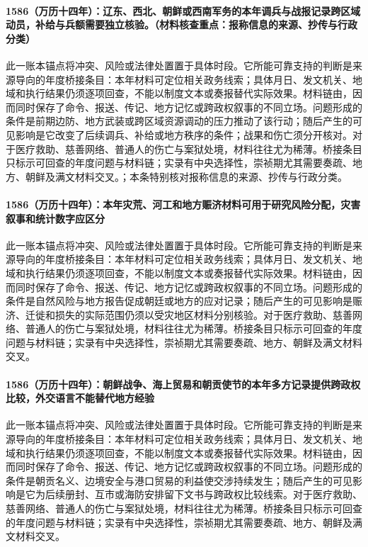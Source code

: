 \paragraph{1586（万历十四年）：辽东、西北、朝鲜或西南军务的本年调兵与战报记录跨区域动员，补给与兵额需要独立核验。（材料核查重点：报称信息的来源、抄传与行政分类）} 此一账本锚点将冲突、风险或法律处置置于具体时段。它所能可靠支持的判断是来源导向的年度桥接条目：本年材料可定位相关政务线索；具体月日、发文机关、地域和执行结果仍须逐项回查，不能以制度文本或奏报替代实际效果。材料链由，因而同时保存了命令、报送、传记、地方记忆或跨政权叙事的不同立场。问题形成的条件是前期边防、地方武装或跨区域资源调动的压力推动了该行动；随后产生的可见影响是它改变了后续调兵、补给或地方秩序的条件；战果和伤亡须分开核对。对于医疗救助、慈善网络、普通人的伤亡与案狱处境，材料往往尤为稀薄。桥接条目只标示可回查的年度问题与材料链；实录有中央选择性，崇祯期尤其需要奏疏、地方、朝鲜及满文材料交叉。；本条特别核对报称信息的来源、抄传与行政分类。

\paragraph{1586（万历十四年）：本年灾荒、河工和地方赈济材料可用于研究风险分配，灾害叙事和统计数字应区分} 此一账本锚点将冲突、风险或法律处置置于具体时段。它所能可靠支持的判断是来源导向的年度桥接条目：本年材料可定位相关政务线索；具体月日、发文机关、地域和执行结果仍须逐项回查，不能以制度文本或奏报替代实际效果。材料链由，因而同时保存了命令、报送、传记、地方记忆或跨政权叙事的不同立场。问题形成的条件是自然风险与地方报告促成朝廷或地方的应对记录；随后产生的可见影响是赈济、迁徙和损失的实际范围仍须以受灾地区材料分别核验。对于医疗救助、慈善网络、普通人的伤亡与案狱处境，材料往往尤为稀薄。桥接条目只标示可回查的年度问题与材料链；实录有中央选择性，崇祯期尤其需要奏疏、地方、朝鲜及满文材料交叉。

\paragraph{1586（万历十四年）：朝鲜战争、海上贸易和朝贡使节的本年多方记录提供跨政权比较，外交语言不能替代地方经验} 此一账本锚点将冲突、风险或法律处置置于具体时段。它所能可靠支持的判断是来源导向的年度桥接条目：本年材料可定位相关政务线索；具体月日、发文机关、地域和执行结果仍须逐项回查，不能以制度文本或奏报替代实际效果。材料链由，因而同时保存了命令、报送、传记、地方记忆或跨政权叙事的不同立场。问题形成的条件是朝贡名义、边境安全与港口贸易的利益使交涉持续发生；随后产生的可见影响是它为后续册封、互市或海防安排留下文书与跨政权比较线索。对于医疗救助、慈善网络、普通人的伤亡与案狱处境，材料往往尤为稀薄。桥接条目只标示可回查的年度问题与材料链；实录有中央选择性，崇祯期尤其需要奏疏、地方、朝鲜及满文材料交叉。


